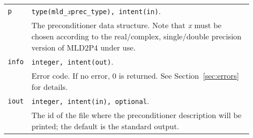\begin{tabular}{p{1.2cm}p{12cm}}
\verb|p|      & \verb|type(mld_|\emph{x}\verb|prec_type), intent(in)|.\\
              & The preconditioner data structure. Note that \emph{x} must be chosen according
                to the real/complex, single/double precision version of MLD2P4 under use.\\
\verb|info|   & \verb|integer, intent(out)|.\\
              & Error code. If no error, 0 is returned. See Section~\ref{sec:errors} for details.\\
\verb|iout|   & \verb|integer, intent(in), optional|.\\
              & The id of the file where the preconditioner description
                will be printed; the default is the standard output.\\
\end{tabular}

